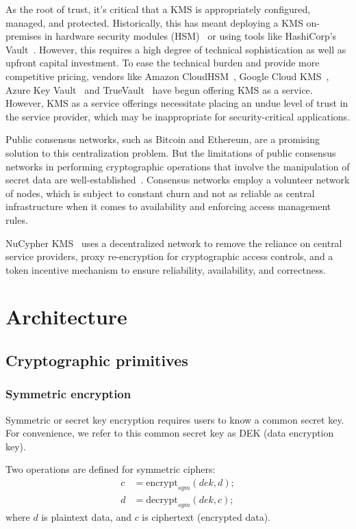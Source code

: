 \documentclass[longbibliography,nofootinbib]{revtex4-1}
\newcommand{\kms}{NuCypher KMS}
\begin{document}
As the root of trust, it's critical that a KMS is appropriately configured, managed, and protected.
Historically, this has meant deploying a KMS on-premises in hardware security modules (HSM)~\cite{wiki:hsm} or using tools like
HashiCorp's Vault~\cite{web:hashicorp-vault}.
However, this requires a high degree of technical sophistication as well as upfront capital investment.
To ease the technical burden and provide more competitive pricing, vendors like Amazon CloudHSM~\cite{web:aws-cloudhsm},
Google Cloud KMS~\cite{web:google-cloud-kms}, Azure Key Vault~\cite{web:azure-key-vault} and TrueVault~\cite{web:truevault}
have begun offering KMS as a service.
However, KMS as a service offerings necessitate placing an undue level of trust in the service provider, which may
be inappropriate for security-critical applications.

Public consensus networks, such as Bitcoin and Ethereum, are a promising solution to this centralization problem.
But the limitations of public consensus networks in performing cryptographic operations that involve the manipulation of secret
data are well-established~\cite{cryptoeprint:2017:201}. Consensus networks employ a volunteer network of nodes,
which is subject to constant churn and not as reliable as central infrastructure when it comes to availability and
enforcing access management rules.

\kms~ uses a decentralized network to remove the reliance on central service providers, proxy re-encryption for cryptographic
access controls, and a token incentive mechanism to ensure reliability, availability, and correctness.

\section{Architecture}

\subsection{Cryptographic primitives}

\subsubsection{Symmetric encryption}

Symmetric or secret key encryption requires users to know a common secret key.
For convenience, we refer to this common secret key as DEK (data encryption key).

Two operations are defined for symmetric ciphers:
\begin{align}
    c &= \text{encrypt}_{sym}(dek, d);\\
    d &= \text{decrypt}_{sym}(dek, c);
\end{align}
where $d$ is plaintext data, and $c$ is ciphertext (encrypted data).
\end{document}
